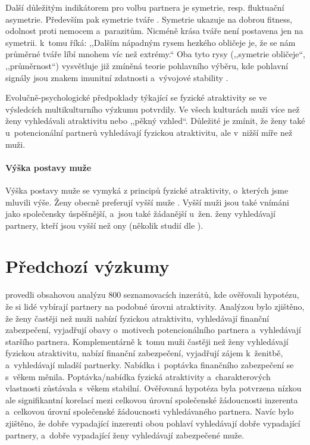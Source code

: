 \documentclass[a4paper, 12pt, notitlepage, oneside, numbers=noenddot]{report}
\begin{document}
Další důležitým indikátorem pro volbu partnera je symetrie,
resp. fluktuační asymetrie. Především pak symetrie tváře
\citep{Ridley2007}.  Symetrie ukazuje na dobrou fitness, odolnost
proti nemocem a~parazitům.  Nicméně krása tváře není postavena jen na
symetrii. \citet{Ridley2007} k~tomu říká: ,,Dalším nápadným rysem
hezkého obličeje je, že se nám průměrné tváře líbí mnohem víc než
extrémy.`` Oba tyto rysy (,,symetrie obličeje``, ,,průměrnost``)
vysvětluje již zmíněná teorie pohlavního výběru, kde pohlavní signály
jsou znakem imunitní zdatnosti a~vývojové stability \citep{Barber1995}.

Evolučně-psychologické předpoklady týkající se fyzické atraktivity se
ve výsledcích multikulturního výzkumu potvrdily.  Ve všech kulturách
muži více než ženy vyhledávali atraktivitu nebo ,,pěkný vzhled``.
Důležité je zmínit, že ženy také u~potencionální partnerů vyhledávají
fyzickou atraktivitu, ale v~nižší míře než muži.

\paragraph{Výška postavy muže}

Výška postavy muže se vymyká z principů fyzické atraktivity, o~kterých
jsme mluvili výše.  Ženy obecně preferují vyšší muže
\citep{Barber1995, Ridley2007}.  Vyšší muži jsou také vnímáni jako
společensky úspěšnější, a~jsou také žádanější u~žen. ženy vyhledávají
partnery, kteří jsou vyšší než ony (několik studií dle
\citealp{Barber1995}).

\section{Předchozí výzkumy}
\citet{HarrisonSaeed1977} provedli obsahovou analýzu 800 seznamovacích
inzerátů, kde ověřovali hypotézu, že si lidé vybírají partnery na
podobné úrovni atraktivity. Analýzou bylo zjištěno, že ženy častěji
než muži nabízí fyzickou atraktivitu, vyhledávají finanční
zabezpečení, vyjadřují obavy o~motivech potencionálního partnera
a~vyhledávají staršího partnera. Komplementárně k~tomu muži častěji
než ženy vyhledávají fyzickou atraktivitu, nabízí finanční
zabezpečení, vyjadřují zájem k~ženitbě, a~vyhledávají mladší
partnerky. Nabídka i~poptávka finančního zabezpečení se s~věkem
měnila. Poptávka/nabídka fyzická atraktivity a~charakterových
vlastnosti zůstávala s~věkem stabilní.  Ověřovaná hypotéza byla
potvrzena nízkou ale signifikantní korelací mezi celkovou úrovní
společenské žádoucnosti inzerenta a~celkovou úrovní společenské
žádoucnosti vyhledávaného partnera. Navíc bylo zjištěno, že dobře
vypadající inzerenti obou pohlaví vyhledávají dobře vypadající
partnery, a~dobře vypadající ženy vyhledávají zabezpečené muže.
\end{document}
